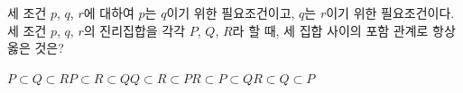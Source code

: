세 조건 $p$, $q$, $r$에 대하여 $p$는 $q$이기 위한 필요조건이고, $q$는 $r$이기 위한 필요조건이다. 세 조건 $p$, $q$, $r$의 진리집합을 각각 $P$, $Q$, $R$라 할 때, 세 집합 사이의 포함 관계로 항상 옳은 것은?
\begin{choices32}{$P\subset Q\subset R$}{$P\subset R\subset Q$}{$Q\subset R\subset P$}{$R\subset P\subset Q$}{$R\subset Q\subset P$}\end{choices32}
